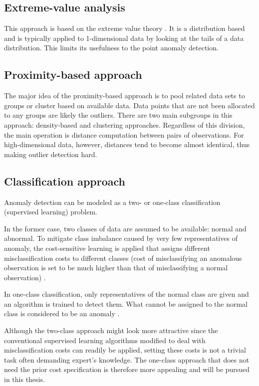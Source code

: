 \subsection{Extreme-value analysis}\label{extremevalue}
This approach is based on the extreme value theory \cite{Castillo:2004}. It is a distribution based and is typically applied to 1-dimensional data by looking at the tails of a data distribution. This limits its usefulness to the point anomaly detection.

\subsection{Proximity-based approach}\label{proximity}
The major idea of the proximity-based approach is to pool related data sets to groups or cluster based on available data. Data points that are not been allocated to any groups are likely the outliers. There are two main subgroups in this approach: density-based and clustering approaches. Regardless of this division, the main operation is distance computation between pairs of observations. For high-dimensional data, however, distances tend to become almost identical, thus making outlier detection hard. 

\subsection{Classification approach}\label{classification}
Anomaly detection can be modeled as a two- or one-class classification (supervised learning) problem. 

In the former case, two classes of data are assumed to be available: normal and abnormal. To mitigate class imbalance caused by very few representatives of anomaly, the cost-sensitive learning is applied that assigns different misclassification costs to different classes (cost of misclassifying an anomalous observation is set to be much higher than that of misclassifying a normal observation) \cite{Elkan:2001:FCL:1642194.1642224}.

In one-class classification, only representatives of the normal class are given and an algorithm is trained to detect them. What cannot be assigned to the normal class is considered to be an anomaly \cite{Amer:2013:EOS:2500853.2500857}.

Although the two-class approach might look more attractive since the conventional supervised learning algorithms modified to deal with misclassification costs can readily be applied, setting these costs is not a trivial task often demanding expert's knowledge. The one-class approach that does not need the prior cost specification is therefore more appealing and will be pursued in this thesis. 


